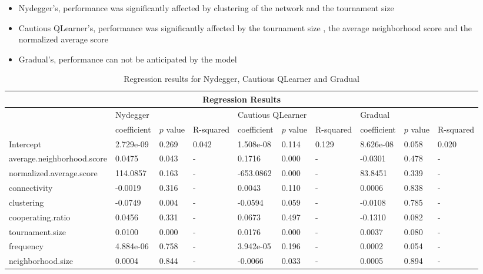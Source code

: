 \begin{itemize}
	\item Nydegger's, performance was significantly affected by clustering of the network
				and the tournament size
	\item Cautious QLearner's, performance was significantly affected by the tournament size
				, the average neighborhood score and the normalized average score
	\item Gradual's, performance can not be anticipated by the model
\end{itemize}

\begin{table}[!hbtp]
	\centering
	\begin{adjustbox}{width=0.5\textwidth}
		\small
		\begin{tabular}{|l|l|l|l|l|l|l|l|l|l|}
			\hline
			\multicolumn{10}{|c|}{Regression Results}                                                                       \\ \hline
			& \multicolumn{3}{l|}{Nydegger} & \multicolumn{3}{l|}{Cautious QLearner} & \multicolumn{3}{l|}{Gradual} \\ \hline
			  & coefficient & \(p\) value & R-squared & coefficient & \(p\) value & R-squared & coefficient & \(p\) value & R-squared &   \\ \hline

			Intercept                  &  2.729e-09   & 0.269    & 0.042 		& 1.508e-08  &    0.114   & 0.129		& 8.626e-08   &  0.058 &  0.020       \\ \hline
			average.neighborhood.score &     0.0475   & 0.043    & - 				&    0.1716  &    0.000   & -  			&   -0.0301   &  0.478 &  -					\\ \hline
			normalized.average.score   &   114.0857   & 0.163    & - 				& -653.0862  &    0.000   & - 			&   83.8451   &  0.339 &  -						\\ \hline
			connectivity               &    -0.0019   & 0.316    & - 				&    0.0043  &    0.110   & - 		 	&    0.0006   &  0.838 &  -  					\\ \hline
			clustering                 &    -0.0749   & 0.004    & - 				&   -0.0594  &    0.059   & -  			&   -0.0108   &  0.785 & 	-					\\ \hline
			cooperating.ratio          &     0.0456   & 0.331    & - 				&    0.0673  &    0.497   & - 			&   -0.1310   &  0.082 &  -						\\ \hline
			tournament.size            &     0.0100   & 0.000    & - 				&    0.0176  &    0.000   & - 		  &    0.0037   &  0.080 & 	-						\\ \hline
			frequency                  &  4.884e-06   & 0.758    & -  			& 3.942e-05  &    0.196   & - 			&    0.0002   &  0.054 &  -		 			\\ \hline
			neighborhood.size          &     0.0004   & 0.844    & - 				&   -0.0066  &    0.033   & -  			&    0.0005   &  0.894 &  -						\\ \hline

		\end{tabular}
	\end{adjustbox}
	\caption{Regression results for Nydegger, Cautious QLearner and Gradual}
	\label{reg-for-top}
\end{table}

